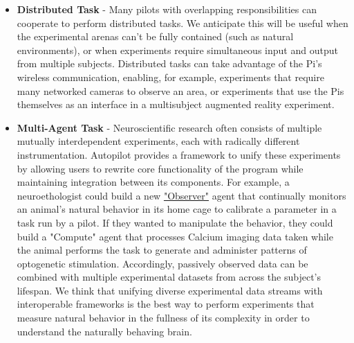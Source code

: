 \begin{itemize}
    \item \textbf{Distributed Task} - Many pilots with overlapping responsibilities can cooperate to perform distributed tasks. We anticipate this will be useful when the experimental arenas can't be fully contained (such as natural environments), or when experiments require simultaneous input and output from multiple subjects. Distributed tasks can take advantage of the Pi's wireless communication, enabling, for example, experiments that require many networked cameras to observe an area, or experiments that use the Pis themselves as an interface in a multisubject augmented reality experiment.
    \item \textbf{Multi-Agent Task} - Neuroscientific research often consists of multiple mutually interdependent experiments, each with radically different instrumentation. Autopilot provides a framework to unify these experiments by allowing users to rewrite core functionality of the program while maintaining integration between its components. For example, a neuroethologist could build a new \hyperref[sec:futureagents]{"Observer"} agent that continually monitors an animal's natural behavior in its home cage to calibrate a parameter in a task run by a pilot. If they wanted to manipulate the behavior, they could build a "Compute" agent that processes Calcium imaging data taken while the animal performs the task to generate and administer patterns of optogenetic stimulation. Accordingly, passively observed data can be combined with multiple experimental datasets from across the subject's lifespan. We think that unifying diverse experimental data streams with interoperable frameworks is the best way to perform experiments that measure natural behavior in the fullness of its complexity in order to understand the naturally behaving brain\citep{dattaComputationalNeuroethologyCall2019}.
\end{itemize}
